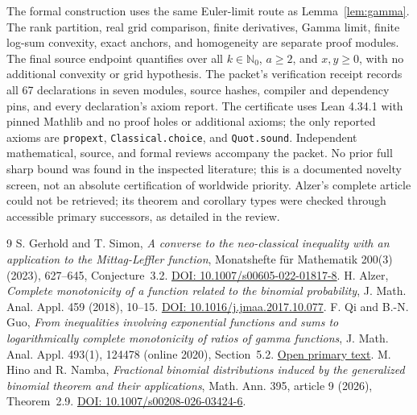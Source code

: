 \documentclass[11pt]{article}
\begin{document}
The formal construction uses the same Euler-limit route as
Lemma~\ref{lem:gamma}. The rank partition, real grid comparison, finite
derivatives, Gamma limit, finite log-sum convexity, exact anchors, and
homogeneity are separate proof modules. The final source endpoint quantifies over all $k\in\mathbb N_0$, $a\geq2$, and $x,y\geq0$, with no
additional convexity or grid hypothesis. The packet's verification receipt
records all 67 declarations in seven modules, source hashes, compiler and
dependency pins, and every declaration's axiom report. The certificate uses
Lean 4.34.1 with pinned Mathlib and no proof holes or additional axioms;
the only reported axioms are \texttt{propext}, \texttt{Classical.choice},
and \texttt{Quot.sound}. Independent mathematical, source, and formal
reviews accompany the packet. No prior full sharp bound was found in the
inspected literature; this is a documented novelty screen, not an absolute
certification of worldwide priority. Alzer's complete article could not be
retrieved; its theorem and corollary types were checked through accessible
primary successors, as detailed in the review.

\begin{thebibliography}{9}
 S. Gerhold and T. Simon,
\emph{A converse to the neo-classical inequality with an application to the
Mittag-Leffler function}, Monatshefte f\"ur Mathematik 200(3) (2023), 627--645,
Conjecture~3.2. \href{https://doi.org/10.1007/s00605-022-01817-8}{DOI: 10.1007/s00605-022-01817-8}.
 H. Alzer,
\emph{Complete monotonicity of a function related to the binomial probability},
J. Math. Anal. Appl. 459 (2018), 10--15.
\href{https://doi.org/10.1016/j.jmaa.2017.10.077}{DOI: 10.1016/j.jmaa.2017.10.077}.
 F. Qi and B.-N. Guo,
\emph{From inequalities involving exponential functions and sums to
logarithmically complete monotonicity of ratios of gamma functions},
J. Math. Anal. Appl. 493(1), 124478 (online 2020), Section~5.2.
\href{https://pmc.ncbi.nlm.nih.gov/articles/PMC7416756/}{Open primary text}.
 M. Hino and R. Namba,
\emph{Fractional binomial distributions induced by the generalized binomial
theorem and their applications}, Math. Ann. 395, article 9 (2026), Theorem~2.9.
\href{https://doi.org/10.1007/s00208-026-03424-6}{DOI: 10.1007/s00208-026-03424-6}.
\end{thebibliography}
\end{document}
